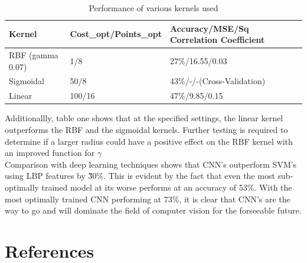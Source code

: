 \documentclass[preprint,12pt]{elsarticle}
\begin{document}
\begin{table}[h]
\centering
\begin{tabular}{l l l}
\hline
\textbf{Kernel} & \textbf{Cost\_opt/Points\_opt} & \textbf{Accuracy/MSE/Sq Correlation Coefficient}\\
\hline
RBF (gamma 0.07) & 1/8 & 27\%/16.55/0.03 \\
Sigmoidal & 50/8 & 43\%/-/-(Cross-Validation) \\
Linear & 100/16 & 47\%/9.85/0.15 \\
\hline
\end{tabular}
\caption{Performance of various kernels used}
\end{table}
Additionallly, table one shows that at the specified settings, the linear kernel outperforms the RBF and the sigmoidal kernels. Further testing is required to determine if a larger radius could have a positive effect on the RBF kernel with an improved function for $\gamma$\\ 

Comparison with deep learning techniques shows that CNN's outperform SVM's using LBP features by \~ 30\%. This is evident by the fact that even the most sub-optimally trained model at its worse performs at an accuracy of 53\%. With the most optimally trained CNN performing at 73\%, it is clear that CNN's are the way to go and will dominate the field of computer vision for the forseeable future.


\section{References}









\end{document}
